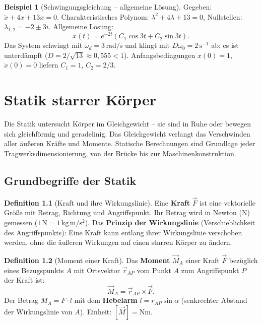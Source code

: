 ﻿\documentclass[a4paper,12pt]{report}
\theoremstyle{definition}
\newtheorem{definition}{Definition}
\newtheorem{beispiel}{Beispiel}
\begin{document}
\begin{beispiel}[Schwingungsgleichung -- allgemeine L\"osung]
Gegeben: $\ddot{x} + 4\dot{x} + 13x = 0$.
Charakteristisches Polynom: $\lambda^2 + 4\lambda + 13 = 0$,
Nullstellen: $\lambda_{1,2} = -2 \pm 3i$.
Allgemeine L\"osung:
\[
  x(t) = e^{-2t}(C_1\cos 3t + C_2\sin 3t).
\]
Das System schwingt mit $\omega_d = 3\,\mathrm{rad/s}$ und klingt mit
$D\omega_0 = 2\,\mathrm{s^{-1}}$ ab; es ist unterd\"ampft ($D = 2/\sqrt{13} \approx 0{,}555 < 1$).
Anfangsbedingungen $x(0) = 1$, $\dot{x}(0) = 0$ liefern $C_1 = 1$, $C_2 = 2/3$.
\end{beispiel}

\chapter{Statik starrer K\"orper}

Die Statik untersucht K\"orper im Gleichgewicht -- sie sind in Ruhe
oder bewegen sich gleichf\"ormig und geradelinig. Das Gleichgewicht
verlangt das Verschwinden aller \"au\ss{}eren Kr\"afte und Momente.
Statische Berechnungen sind Grundlage jeder Tragwerksdimensionierung,
von der Br\"ucke bis zur Maschinenkonstruktion.

\section{Grundbegriffe der Statik}

\begin{definition}[Kraft und ihre Wirkungslinie]
Eine \textbf{Kraft} $\vec{F}$ ist eine vektorielle Gr\"o\ss{}e mit
Betrag, Richtung und Angriffspunkt. Ihr Betrag wird in Newton ($\mathrm{N}$)
gemessen ($1\,\mathrm{N} = 1\,\mathrm{kg\,m/s^2}$).
Das \textbf{Prinzip der Wirkungslinie} (Verschieblichkeit des Angriffspunkts):
Eine Kraft kann entlang ihrer Wirkungslinie verschoben werden,
ohne die \"au\ss{}eren Wirkungen auf einen starren K\"orper zu \"andern.
\end{definition}

\begin{definition}[Moment einer Kraft]
Das \textbf{Moment} $\vec{M}_A$ einer Kraft $\vec{F}$ bez\"uglich
eines Bezugspunkts $A$ mit Ortsvektor $\vec{r}_{AP}$ vom Punkt $A$
zum Angriffspunkt $P$ der Kraft ist:
\[
  \vec{M}_A = \vec{r}_{AP} \times \vec{F}.
\]
Der Betrag $M_A = F \cdot l$ mit dem \textbf{Hebelarm} $l = r_{AP}\sin\alpha$
(senkrechter Abstand der Wirkungslinie von $A$).
Einheit: $[\vec{M}] = \mathrm{Nm}$.
\end{definition}
\end{document}
